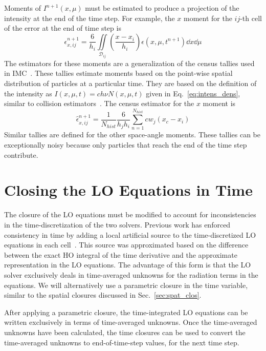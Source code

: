 Moments of $I^{n+1}(x,\mu)$ must be estimated to produce a projection of the intensity at
the end of the time step.
For example, the $x$ moment for the $ij$-th cell of the error at the end of time step is
\begin{equation}
    \epsilon^{n+1}_{x,ij} = \frac{6}{h_i} \iint\limits_{\mathcal{D}_{ij}} \left(\frac{x
    - x_i}{h_i}\right) \epsilon(x,\mu,t^{n+1}) \dd x \dd \mu
\end{equation}
The estimators for these moments are a generalization of the census
tallies used in IMC~\cite{wollaber_review,wollaber_thesis}.  These tallies estimate
moments based on the point-wise spatial distribution of particles at a particular time.
They are based on the definition of the intensity as $I(x,\mu,t) = c h \nu N(x,\mu,t)$ given in
Eq.~\eqref{eq:intens_dens}, similar to collision estimators~\cite{shultis_mc,mcnp}.  The census estimator for the $x$ moment is
\begin{equation}
    \hat\epsilon^{n+1}_{x,ij} = \frac{1}{N_{hist}} \frac{6}{h_j h_i} \sum_{n=1}^{N_{hist}}
    c w_j  \left(x_{c} - x_{i}\right)
\end{equation}
Similar tallies are defined for the other space-angle moments. These tallies can be
exceptionally noisy because only particles that reach the end of the time step contribute.


\section{Closing the LO Equations in Time}

The closure of the LO equations must be modified to account for inconsistencies in the
time-discretization of the two solvers. Previous work has enforced
consistency in time by adding a local artificial source to the time-discretized LO
equations in each cell~\cite{holo_rh}.  This
source was approximated based on the difference between the exact HO integral of the time
derivative and the approximate representation in the LO equations. The advantage
of this form is that the LO solver exclusively deals in
time-averaged unknowns for the radiation terms in the equations.  
We will alternatively use a
parametric closure in the time variable, similar to the spatial closures discussed in 
Sec.~\ref{sec:spat_clos}. 


After applying a parametric closure, the time-integrated LO equations can be written exclusively in terms
of time-averaged unknowns.   Once the time-averaged unknowns have been calculated,
the time closures can be used to convert the time-averaged unknowns to end-of-time-step
values, for the next time step.


